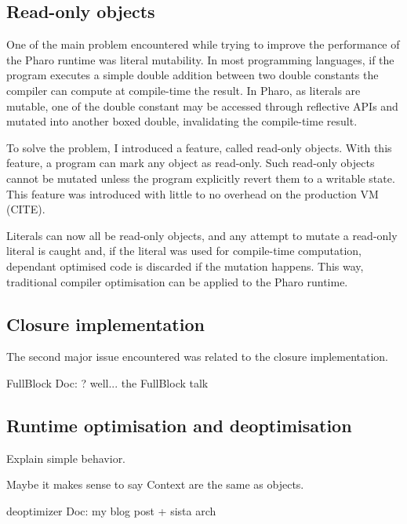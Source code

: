 \documentclass[a4paper,12pt,twoside]{../includes/ThesisStyle}
\begin{document}
\subsection{Read-only objects}

One of the main problem encountered while trying to improve the performance of the Pharo runtime was literal mutability. In most programming languages, if the program executes a simple double addition between two double constants the compiler can compute at compile-time the result. In Pharo, as literals are mutable, one of the double constant may be accessed through reflective APIs and mutated into another boxed double, invalidating the compile-time result. 

To solve the problem, I introduced a feature, called read-only objects. With this feature, a program can mark any object as read-only. Such read-only objects cannot be mutated unless the program explicitly revert them to a writable state. This feature was introduced with little to no overhead on the production VM (CITE). 

Literals can now all be read-only objects, and any attempt to mutate a read-only literal is caught and, if the literal was used for compile-time computation, dependant optimised code is discarded if the mutation happens. This way, traditional compiler optimisation can be applied to the Pharo runtime.

\subsection{Closure implementation}

The second major issue encountered was related to the closure implementation. 

FullBlock
Doc: ? well... the FullBlock talk

\subsection{Runtime optimisation and deoptimisation}

Explain simple behavior.

Maybe it makes sense to say Context are the same as objects.

deoptimizer 
Doc: my blog post + sista arch


\ifx\wholebook\relax\else
    
\end{document}
